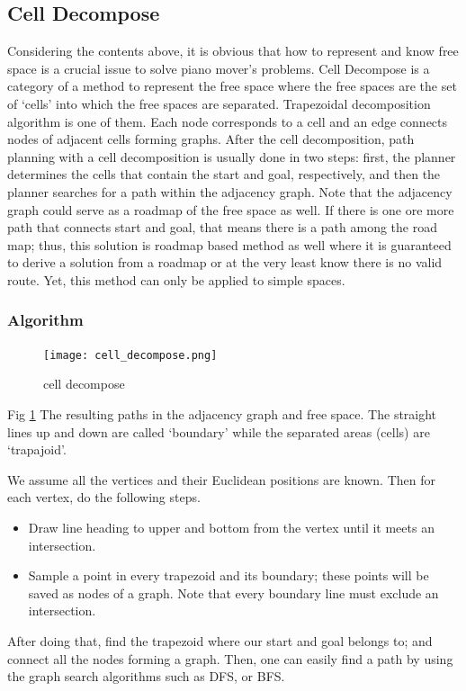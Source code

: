 \documentclass[11pt]{article}
\begin{document}
\subsection{Cell Decompose}
Considering the contents above, it is obvious that how to represent and know free space is a crucial issue to solve piano mover’s problems. Cell Decompose is a category of a method to represent the free space where the free spaces are the set of ‘cells’ into which the free spaces are separated. Trapezoidal decomposition algorithm is one of them. Each node corresponds to a cell and an edge connects nodes of adjacent cells forming graphs. After the cell decomposition, path planning with a cell decomposition is usually done in two steps: first, the planner determines the cells that contain the start and goal, respectively, and then the planner searches for a path within the adjacency graph. Note that the adjacency graph could serve as a roadmap of the free space as well. If there is one ore more path that connects start and goal, that means there is a path among the road map; thus, this solution is roadmap based method as well where it is guaranteed to derive a solution from a roadmap or at the very least know there is no valid route. Yet, this method can only be applied to simple spaces.
\subsubsection{Algorithm}
\begin{figure}[h]
  \centering
  \texttt{[image: cell\_decompose.png]}
  \caption{cell decompose}
  \label{fig:cell_decompose}
\end{figure}
Fig \ref{fig:cell_decompose} The resulting paths in the adjacency graph and free space. The straight lines up and down are called ‘boundary’ while the separated areas (cells) are ‘trapajoid’.

We assume all the vertices and their Euclidean positions are known. Then for each vertex, do the following steps.
\begin{itemize}
  \item Draw line heading to upper and bottom from the vertex until it meets an intersection.
  \item Sample a point in every trapezoid and its boundary; these points will be saved as nodes of a graph. Note that every boundary line must exclude an intersection.
\end{itemize}
After doing that, find the trapezoid where our start and goal belongs to; and connect all the nodes forming a graph. Then, one can easily find a path by using the graph search algorithms such as DFS, or BFS.
\end{document}
